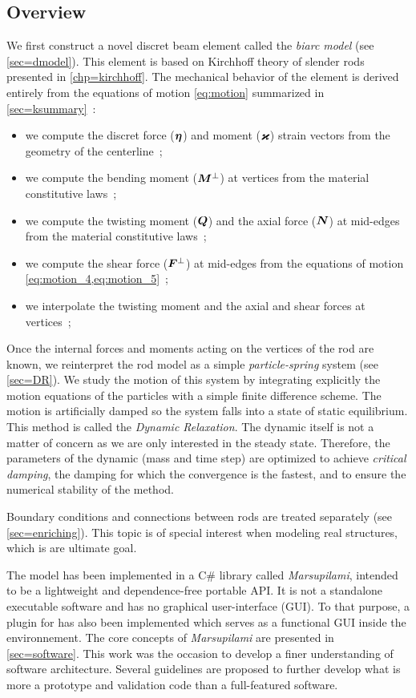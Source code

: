 \subsection{Overview}
We first construct a novel discret beam element called the \emph{biarc model} (see \cref{sec=dmodel}). This element is based on Kirchhoff theory of slender rods presented in \cref{chp=kirchhoff}. The mechanical behavior of the element is derived entirely from the equations of motion \cref{eq:motion} summarized in \cref{sec=ksummary}~:
\begin{itemize}
\item we compute the discret force ($\boldsymbol{\eta}$) and moment ($\boldsymbol{\varkappa}$) strain vectors from the geometry of the centerline~;
\item we compute the bending moment ($\boldsymbol{M}^{\perp}$) at vertices from the material constitutive laws~;
\item we compute the twisting moment ($\boldsymbol{Q}$) and the axial force ($\boldsymbol{N}$) at mid-edges from the material constitutive laws~;
\item we compute the shear force ($\boldsymbol{F}^{\perp}$) at mid-edges from the equations of motion \cref{eq:motion_4,eq:motion_5}~;
\item we interpolate the twisting moment and the axial and shear forces at vertices~;
\end{itemize}
Once the internal forces and moments acting on the vertices of the rod are known, we reinterpret the rod model as a simple \emph{particle-spring} system (see \cref{sec=DR}). We study the motion of this system by integrating explicitly the motion equations of the particles with a simple finite difference scheme. The motion is artificially damped so the system falls into a state of static equilibrium. This method is called the \emph{Dynamic Relaxation}. The dynamic itself is not a matter of concern as we are only interested in the steady state. Therefore, the parameters of the dynamic (mass and time step) are optimized to achieve \emph{critical damping}, the damping for which the convergence is the fastest, and to ensure the numerical stability of the method.

Boundary conditions and connections between rods are treated separately (see \cref{sec=enriching}). This topic is of special interest when modeling real structures, which is are ultimate goal.

The model has been implemented in a C\# library called \emph{Marsupilami}, intended to be a lightweight and dependence-free portable API. It is not a standalone executable software and has no graphical user-interface (GUI). To that purpose, a plugin for \grasshopper{} has also been implemented which serves as a functional GUI inside the \rhino{} environnement. The core concepts of \emph{Marsupilami} are presented in \cref{sec=software}. This work was the occasion to develop a finer understanding of software architecture. Several guidelines are proposed to further develop what is more a prototype and validation code than a full-featured software.

